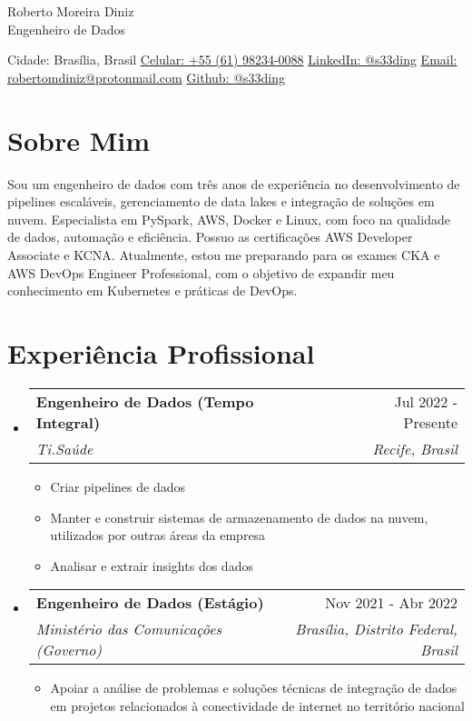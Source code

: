 \documentclass[letterpaper,11pt]{article}%
\makeatletter
\newcommand{\resumeItem}[1]{\item{#1 \vspace{-3pt}}}%
\newcommand{\resumeSubheading}[4]{\vspace{-1pt}\item\begin{tabular*}{0.97\textwidth}[t]{l@{\extracolsep{\fill}}r}\textbf{#1} & #2 \\\textit{\small #3} & \textit{\small #4} \\\end{tabular*}\vspace{-8pt}}%
\newcommand{\resumeSubHeadingListStart}{\begin{itemize}[leftmargin=0.15in, label={}, itemsep=0pt, parsep=0pt]}%
\newcommand{\resumeSubHeadingListEnd}{\end{itemize}}%
\newcommand{\resumeItemListStart}{\begin{itemize}[itemsep=0pt, parsep=0pt]}%
\newcommand{\resumeItemListEnd}{\end{itemize}\vspace{-1pt}}%
\makeatother
\begin{document}
%
\normalsize%
\section*{}%
\label{sec:}%
\begin{center}%
{\LARGE Roberto Moreira Diniz} \\ \vspace{5pt}%
{\large Engenheiro de Dados} \\ \vspace{5pt}%
\end{center}%
\begin{center}%
\small%
Cidade: Brasília, Brasil \quad \textbullet \quad \href{https://wa.me/qr/UYOUX2DZ7BYHI1}{Celular: +55 (61) 98234-0088} \quad \textbullet \quad \href{https://www.linkedin.com/in/s33ding/}{LinkedIn: @s33ding} \quad \textbullet \quad \href{mailto:robertomdiniz@protonmail.com}{Email: robertomdiniz@protonmail.com} \quad \textbullet \quad \href{https://github.com/s33ding}{Github: @s33ding}%
\normalsize%
\end{center}

%
\section*{Sobre Mim}%
\label{sec:SobreMim}%
Sou um engenheiro de dados com três anos de experiência no desenvolvimento de pipelines escaláveis, gerenciamento de data lakes e integração de soluções em nuvem. Especialista em PySpark, AWS, Docker e Linux, com foco na qualidade de dados, automação e eficiência. Possuo as certificações AWS Developer Associate e KCNA. Atualmente, estou me preparando para os exames CKA e AWS DevOps Engineer Professional, com o objetivo de expandir meu conhecimento em Kubernetes e práticas de DevOps.

%
\section*{Experiência Profissional}%
\label{sec:ExperinciaProfissional}%
\resumeSubHeadingListStart%
\resumeSubheading{Engenheiro de Dados (Tempo Integral)}{Jul 2022 - Presente}{Ti.Saúde}{Recife, Brasil}%
\resumeItemListStart%
\resumeItem{Criar pipelines de dados}%
\resumeItem{Manter e construir sistemas de armazenamento de dados na nuvem, utilizados por outras áreas da empresa}%
\resumeItem{Analisar e extrair insights dos dados}%
\resumeItemListEnd%
\resumeSubheading{Engenheiro de Dados (Estágio)}{Nov 2021 - Abr 2022}{Ministério das Comunicações (Governo)}{Brasília, Distrito Federal, Brasil}%
\resumeItemListStart%
\resumeItem{Apoiar a análise de problemas e soluções técnicas de integração de dados em projetos relacionados à conectividade de internet no território nacional}%
\resumeItemListEnd%
\resumeSubHeadingListEnd
\end{document}
